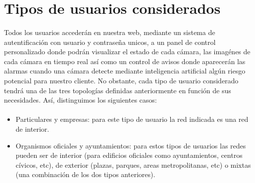 \section{Tipos de usuarios considerados}

\paragraph{}
Todos los usuarios accederán en nuestra web, mediante un sistema de autentificación con usuario y contraseña unicos, a un panel de control
personalizado donde podrán visualizar el estado de cada cámara, las imagénes de cada cámara en tiempo real así como un control de avisos
donde aparecerán las alarmas cuando una cámara detecte mediante inteligencia artificial algún riesgo potencial para nuestro cliente. No obstante, 
cada tipo de usuario considerado tendrá una de las tres topologías definidas anteriormente en función de sus necesidades. Así, distinguimos los siguientes casos:

\paragraph{}
\begin{itemize}
    \item Particulares y empresas: para este tipo de usuario la red indicada es una red de interior.
    \item Organismos oficiales y ayuntamientos: para estos tipos de usuarios las redes pueden ser de interior (para edificios oficiales como ayuntamientos,
    centros cívicos, etc), de exterior (plazas, parques, areas metropolitanas, etc) o mixtas (una combinación de los dos tipos anteriores).
\end{itemize}